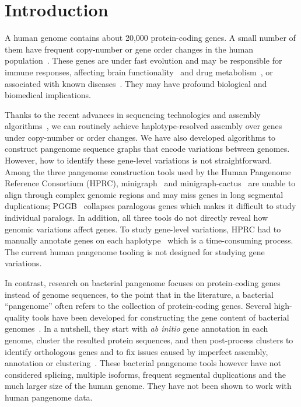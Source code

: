 \documentclass[webpdf,contemporary,large,namedate]{oup-authoring-template}%
\begin{document}
\section{Introduction}
A human genome contains about 20,000 protein-coding genes.
A small number of them have frequent copy-number or gene order changes in the human population~\citep{Sudmant:2010aa,Handsaker:2015ur}.
These genes are under fast evolution
and may be responsible for immune responses,
affecting brain functionality~\citep{Ju:2016aa} and drug metabolism~\citep{Taylor:2020aa},
or associated with known diseases~\citep{Mercuri:2022aa}.
They may have profound biological and biomedical implications.

Thanks to the recent advances in sequencing technologies \citep{Wenger_2019} and assembly algorithms~\citep{Nurk:2020we,Cheng:2021aa,Rautiainen:2023aa},
we can routinely achieve haplotype-resolved assembly over genes under copy-number or order changes.
We have also developed algorithms to construct pangenome sequence graphs that encode variations between genomes.
However, how to identify these gene-level variations is not straightforward.
Among the three pangenome construction tools used by the Human Pangenome Reference Consortium (HPRC),
minigraph~\citep{Li:2020aa} and minigraph-cactus~\citep{Hickey:2023aa} are
unable to align through complex genomic regions and may miss genes in long segmental duplications;
PGGB~\citep{Garrison2023.04.05.535718} collapses paralogous genes which makes it difficult to study individual paralogs.
In addition, all three tools do not directly reveal how genomic variations affect genes.
To study gene-level variations, HPRC
had to manually annotate genes on each haplotype~\citep{Liao:2023aa} which is a time-consuming process.
The current human pangenome tooling is not designed for studying gene variations.

In contrast, research on bacterial pangenome
focuses on protein-coding genes instead of genome sequences, to the point that
in the literature, a bacterial ``pangenome'' often refers to the collection of protein-coding genes.
Several high-quality tools have been developed for constructing the gene content of bacterial genomes~\citep{Page:2015aa,Ding:2018aa,Tonkin-Hill:2020aa,Gautreau:2020aa,Zhou:2020aa}.
In a nutshell, they start with \emph{ab initio} gene annotation in each genome,
cluster the resulted protein sequences,
and then post-process clusters to identify orthologous genes
and to fix issues caused by imperfect assembly, annotation or clustering~\citep{Tonkin-Hill:2023aa}.
These bacterial pangenome tools however have not considered splicing,
multiple isoforms, frequent segmental duplications and the much larger size of the human genome.
They have not been shown to work with human pangenome data.
\end{document}
